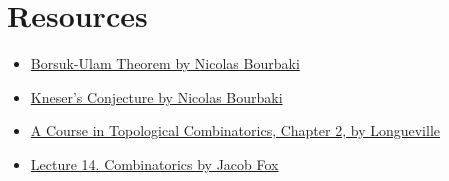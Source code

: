 \documentclass[12pt]{extarticle}
\begin{document}
\section{Resources}

\begin{itemize}
    \item \href{https://www.youtube.com/watch?v=gk6Unu78e-w}{Borsuk-Ulam Theorem by Nicolas Bourbaki}
    \item \href{https://www.youtube.com/watch?v=zG9Y1ksp3Qw}{Kneser's Conjecture by Nicolas Bourbaki}
    \item \href{https://link.springer.com/book/10.1007/978-1-4419-7910-0}{A Course in Topological Combinatorics, Chapter 2, by Longueville}
    \item \href{http://math.mit.edu/~fox/MAT307-lecture14.pdf}{Lecture 14. Combinatorics by Jacob Fox}
\end{itemize}
\end{document}
